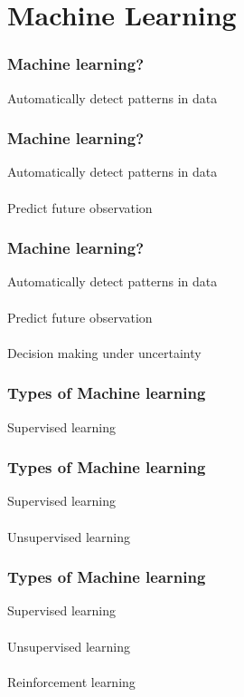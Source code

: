 \documentclass{beamer}
\begin{document}
\section{Machine Learning}

\begin{frame}
	\frametitle{Machine learning?}
	\begin{center}
	Automatically detect patterns in data
	\end{center}
\end{frame}

\begin{frame}
	\frametitle{Machine learning?}
	\begin{center}
		Automatically detect patterns in data\\~\\
		Predict future observation
	\end{center}
\end{frame}

\begin{frame}
	\frametitle{Machine learning?}
	\begin{center}
		Automatically detect patterns in data\\~\\
		Predict future observation\\~\\
		Decision making under uncertainty
	\end{center}
\end{frame}

\begin{frame}
	\frametitle{Types of Machine learning}
	\begin{center}
		Supervised learning
	\end{center}
\end{frame}

\begin{frame}
	\frametitle{Types of Machine learning}
	\begin{center}
		Supervised learning\\~\\
		Unsupervised learning
	\end{center}
\end{frame}

\begin{frame}
	\frametitle{Types of Machine learning}
	\begin{center}
		Supervised learning\\~\\
		Unsupervised learning\\~\\
		Reinforcement learning
	\end{center}
\end{frame}
\end{document}
